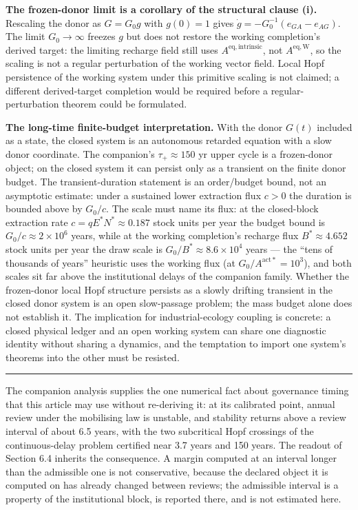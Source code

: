 \documentclass[11pt]{article}
\begin{document}
\textbf{The frozen-donor limit is a corollary of the structural clause
(i).} Rescaling the donor as \(G = G_0 g\) with \(g(0) = 1\) gives
\(\dot g = -G_0^{-1}(e_{GA} - e_{AG})\). The limit \(G_0 \to \infty\)
freezes \(g\) but does not restore the working completion's derived
target: the limiting recharge field still uses
\(A^{\mathrm{eq,intrinsic}}\), not \(A^{\mathrm{eq,W}}\), so the scaling
is not a regular perturbation of the working vector field. Local Hopf
persistence of the working system under this primitive scaling is not
claimed; a different derived-target completion would be required before
a regular-perturbation theorem could be formulated.

\textbf{The long-time finite-budget interpretation.} With the donor
\(G(t)\) included as a state, the closed system is an autonomous
retarded equation with a slow donor coordinate. The companion's
\(\tau_+ \approx 150\) yr upper cycle is a frozen-donor object; on the
closed system it can persist only as a transient on the finite donor
budget. The transient-duration statement is an order/\allowbreak{}budget bound, not
an asymptotic estimate: under a sustained lower extraction flux
\(c > 0\) the duration is bounded above by \(G_0/\allowbreak{}c\). The scale must
name its flux: at the closed-block extraction rate
\(c = qE^*N^* \approx 0.187\) stock units per year the budget bound is
\(G_0/\allowbreak{}c \approx 2 \times 10^6\) years, while at the working completion's
recharge flux \(B^* \approx 4.652\) stock units per year the draw scale
is \(G_0/\allowbreak{}B^* \approx 8.6 \times 10^4\) years --- the ``tens of thousands
of years'' heuristic uses the working flux (at
\(G_0/\allowbreak{}A^{\mathrm{act}*} = 10^3\)), and both scales sit far above the
institutional delays of the companion family. Whether the frozen-donor
local Hopf structure persists as a slowly drifting transient in the
closed donor system is an open slow-passage problem; the mass budget
alone does not establish it. The implication for industrial-ecology
coupling is concrete: a closed physical ledger and an open working
system can share one diagnostic identity without sharing a dynamics, and
the temptation to import one system's theorems into the other must be
resisted.

\begin{center}\rule{0.5\linewidth}{0.5pt}\end{center}

The companion analysis supplies the one numerical fact about governance timing that this article may
use without re-deriving it: at its calibrated point, annual review under the mobilising law is
unstable, and stability returns above a review interval of about 6.5 years, with the two subcritical
Hopf crossings of the continuous-delay problem certified near 3.7 years and 150 years. The readout of
Section 6.4 inherits the consequence. A margin computed at an interval longer than the admissible
one is not conservative, because the declared object it is computed on has already changed between
reviews; the admissible interval is a property of the institutional block, is reported there, and is
not estimated here.
\end{document}
